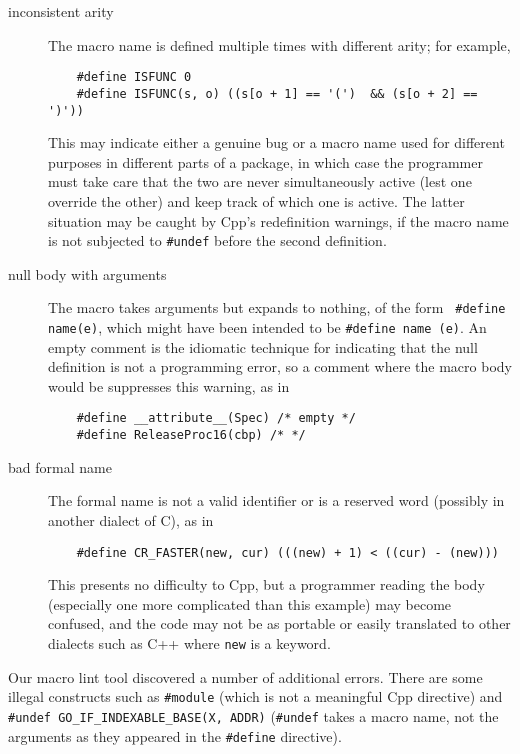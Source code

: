 \documentclass[10pt]{article}
\begin{document}
\begin{description}
\item[inconsistent arity]
        The macro name is defined multiple times with different arity; for example,
\begin{verbatim}
    #define ISFUNC 0
    #define ISFUNC(s, o) ((s[o + 1] == '(')  && (s[o + 2] == ')'))
\end{verbatim}
        This may indicate either a genuine bug or a macro name used for
        different purposes in different parts of a package, in which case
        the programmer must take care that the two are never simultaneously
        active (lest one override the other) and keep track of which one is
        active.  The latter situation may be
        caught by Cpp's redefinition warnings, if the macro name is not
        subjected to {\tt \#undef} before the second definition.

\item[null body with arguments]
        The macro takes arguments but expands to nothing, of the form {\tt
        \#define name(e)},
        which might have been intended to be {\tt \#define name (e)}.
        An empty comment is the idiomatic technique for indicating that the
        null definition is not a programming error, so a comment where the macro
        body would be suppresses this warning, as in
\begin{verbatim}
    #define __attribute__(Spec) /* empty */
    #define ReleaseProc16(cbp) /* */
\end{verbatim}

\item[bad formal name]
        The formal name is not a valid identifier or is a reserved word
        (possibly in another dialect of C), as in
\begin{verbatim}
    #define CR_FASTER(new, cur) (((new) + 1) < ((cur) - (new)))
\end{verbatim}
        This presents no difficulty to Cpp, but a programmer reading the
        body (especially one more complicated than this example) may become
        confused, and the code may not be as portable or easily translated
        to other dialects such as C++ where {\tt new} is a keyword. 

\end{description}


Our macro lint tool discovered a number of additional
errors.  There are some illegal constructs such as {\tt \#module} (which
is not a meaningful Cpp directive) and {\tt \#undef
\verb|GO_IF_INDEXABLE_BASE|(X, ADDR)} ({\tt \#undef} takes a macro name,
not the arguments as they appeared in the {\tt \#define} directive).
\end{document}
